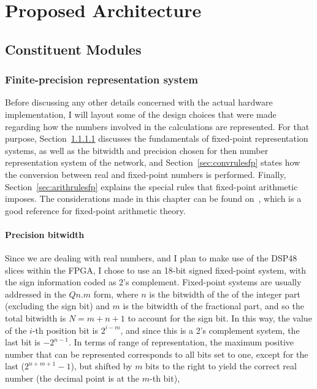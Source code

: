 \chapter{Proposed Architecture}\label{chap:propSol}

\section{Constituent Modules}

\subsection{Finite-precision representation system}
Before discussing any other details concerned with the actual hardware implementation, I will layout some of the design choices that were made regarding how the numbers involved in the calculations are represented. For that purpose, Section~\ref{sec:precbit} discusses the fundamentals of fixed-point representation systems, as well as the bitwidth and precision chosen for then number representation system of the network, and Section~\ref{sec:convrulesfp} states how the conversion between real and fixed-point numbers is performed. Finally, Section~\ref{sec:arithrulesfp} explains the special rules that fixed-point arithmetic imposes. The considerations made in this chapter can be found on~\cite{Yates13}, which is a good reference for fixed-point arithmetic theory.

\subsubsection{Precision bitwidth}\label{sec:precbit} 
Since we are dealing with real numbers, and I plan to make use of the DSP48 slices within the FPGA, I chose to use an 18-bit signed fixed-point system, with the sign information coded as 2's complement. Fixed-point systems are usually addressed in the $Qn.m$ form, where $n$ is the bitwidth of the of the integer part (excluding the sign bit) and $m$ is the bitwidth of the fractional part, and so the total bitwidth is $N=m+n+1$ to account for the sign bit. In this way, the value of the $i$-th position bit is $2^{i-m}$, and since this is a 2's complement system, the last bit is $-2^{n-1}$. In terms of range of representation, the maximum positive number that can be represented corresponds to all bits set to one, except for the last ($2^{n+m+1}-1$), but shifted by $m$ bits to the right to yield the correct real number (the decimal point is at the $m$-th bit), 


